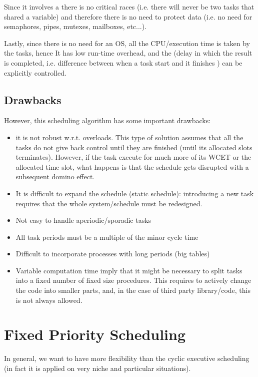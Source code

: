 Since it involves a  there is no critical races (i.e. there will never be two tasks that shared a variable) and therefore there is no need to protect data (i.e. no need for semaphores, pipes, mutexes, mailboxes, etc...).

Lastly, since there is no need for an OS, all the CPU/execution time is taken by the tasks, hence It has low run-time overhead, and the  (delay in which the result is completed, i.e. difference between when a task start and it finishes ) can be explicitly controlled.
\subsection{Drawbacks}

However, this scheduling algorithm has some important drawbacks:
\begin{itemize}
\item it is not robust w.r.t. overloads. This type of solution assumes that all the tasks do not give back control until they are finished (until its allocated slots terminates). However, if the task execute for much more of its WCET or the allocated time slot, what happens is that the schedule gets disrupted with a subsequent domino effect.
\item It is difficult to expand the schedule (static schedule): introducing a new task requires that the whole system/schedule must be redesigned.
\item Not easy to handle aperiodic/sporadic tasks
\item All task periods must be a multiple of the minor cycle time
\item Difficult to incorporate processes with long periods (big tables)
\item Variable computation time imply that it might be necessary to split tasks into a fixed number of fixed size procedures. This requires to actively change the code into smaller parts, and, in the case of third party library/code, this is not always allowed.
\end{itemize}

\section{Fixed Priority Scheduling}

In general, we want to have more flexibility than the cyclic executive scheduling (in fact it is applied on very niche and particular situations).

